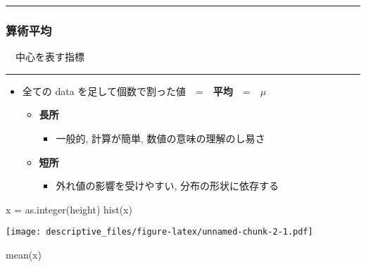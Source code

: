 \documentclass[
]{article}
\newenvironment{Shaded}{\begin{snugshade}}{\end{snugshade}}
\newcommand{\FunctionTok}[1]{\textcolor[rgb]{0.00,0.00,0.00}{#1}}
\newcommand{\NormalTok}[1]{#1}
\newcommand{\OtherTok}[1]{\textcolor[rgb]{0.56,0.35,0.01}{#1}}
\providecommand{\tightlist}{%
  \setlength{\itemsep}{0pt}\setlength{\parskip}{0pt}}
\begin{document}
\begin{center}\rule{0.5\linewidth}{0.5pt}\end{center}

\hypertarget{ux7b97ux8853ux5e73ux5747}{%
\subsubsection{算術平均}\label{ux7b97ux8853ux5e73ux5747}}

　中心を表す指標

\begin{center}\rule{0.5\linewidth}{0.5pt}\end{center}

\begin{itemize}
\item
  全ての data を足して個数で割った値　=　\textbf{平均}　=　\(\mu\)

  \begin{itemize}
  \tightlist
  \item
    \textbf{長所}

    \begin{itemize}
    \tightlist
    \item
      一般的, 計算が簡単, 数値の意味の理解のし易さ
    \end{itemize}
  \item
    \textbf{短所}

    \begin{itemize}
    \tightlist
    \item
      外れ値の影響を受けやすい, 分布の形状に依存する
    \end{itemize}
  \end{itemize}
\end{itemize}

\begin{Shaded}
\begin{Highlighting}[]
\NormalTok{x }\OtherTok{=} \FunctionTok{as.integer}\NormalTok{(height)}
\FunctionTok{hist}\NormalTok{(x)}
\end{Highlighting}
\end{Shaded}

\texttt{[image: descriptive\_files/figure-latex/unnamed-chunk-2-1.pdf]}

\begin{Shaded}
\begin{Highlighting}[]
\FunctionTok{mean}\NormalTok{(x)}
\end{Highlighting}
\end{Shaded}
\end{document}
